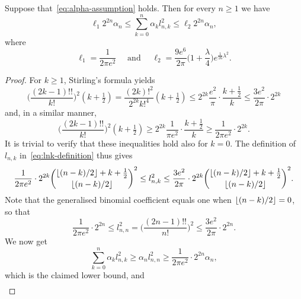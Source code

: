 \documentclass{mcom-l}
\numberwithin{equation}{section}
\numberwithin{theorem}{section} %
\DeclarePairedDelimiter{\floor}{\lfloor}{\rfloor}         %
\begin{document}
\begin{lemma} \label{lemma:legendre-c-lemma}
  Suppose that~\eqref{eq:alpha-assumption} holds.
  Then for every $n \geq 1$ we have
  \begin{equation*}
    \ell_1 2^{2n} \alpha_n \leq \sum_{k=0}^n \alpha_k l_{n,k}^2 \leq \ell_2 2^{2n} \alpha_n,
  \end{equation*}
  where
  \begin{equation} \label{eq:c-ell-L2}
    \ell_1 = \frac{1}{2\pi e^2} \quad \text{ and } \quad \ell_2 = \frac{9e^6}{2\pi} \bigg(1 + \frac{\lambda}{4} \bigg) e^{\frac{1}{16} \lambda^2}.
  \end{equation}
\end{lemma}
\begin{proof}
  For $k \geq 1$, Stirling's formula yields
  \begin{equation*}
    \bigg( \frac{(2k-1)!!}{k!}\bigg)^2 (k+\tfrac{1}{2}) = \frac{(2k)!^2}{2^{2k} k!^4} (k+\tfrac{1}{2}) \leq 2^{2k} \frac{e^2}{\pi} \cdot \frac{k+\frac{1}{2}}{k} \leq \frac{3e^2}{2\pi} \cdot 2^{2k} 
  \end{equation*}
  and, in a similar manner,
  \begin{equation*}
    \bigg( \frac{(2k-1)!!}{k!}\bigg)^2 (k + \tfrac{1}{2}) \geq 2^{2k} \frac{1}{\pi e^2} \cdot \frac{k+\frac{1}{2}}{k} \geq \frac{1}{2\pi e^2} \cdot 2^{2k}.
  \end{equation*}
  It is trivial to verify that these inequalities hold also for $k = 0$.
  The definition of $l_{n,k}$ in~\eqref{eq:lnk-definition} thus gives
  \begin{equation*}
   \frac{1}{2\pi e^2} \cdot 2^{2k} \binom{\floor{(n-k)/2} + k + \frac{1}{2}}{\floor{(n-k)/2}}^2 \leq l_{n, k}^2 \leq \frac{3e^2}{2\pi} \cdot 2^{2k} \binom{\floor{(n-k)/2} + k + \frac{1}{2}}{\floor{(n-k)/2}}^2.
  \end{equation*}
  Note that the generalised binomial coefficient equals one when $\floor{(n-k)/2} = 0$, so that
  \begin{equation*}
    \frac{1}{2\pi e^2} \cdot 2^{2n} \leq l_{n, n}^2 = \bigg( \frac{(2n-1)!!}{n!}\bigg)^2 \leq \frac{3e^2}{2\pi} \cdot 2^{2n}.
  \end{equation*}
  We now get
  \begin{equation*}
    \sum_{k=0}^n \alpha_k l_{n,k}^2 \geq \alpha_n l_{n,n}^2 \geq \frac{1}{2\pi e^2} \cdot 2^{2n} \alpha_n,
  \end{equation*}
  which is the claimed lower bound, and
  \begin{equation*}
    \begin{split}

\end{split}
\end{equation*}
\end{proof}
\end{document}
